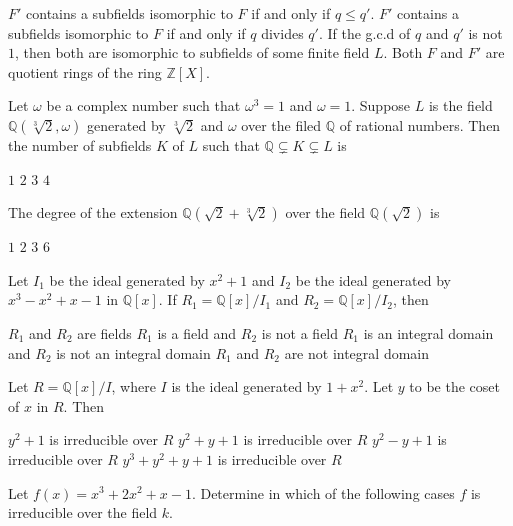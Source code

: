 \documentclass[10pt]{exam}
\begin{document}
\begin{questions}
\begin{checkboxes}
\choice $F'$ contains a subfields isomorphic to $F$ if and only if $q\leq q'$.
\choice $F'$ contains a subfields isomorphic to $F$ if and only if $q$ divides $q'$.
\choice If the g.c.d of  $q$ and $q'$ is not $1$, then both are isomorphic to subfields of some finite field $L$.
\choice Both $F$ and $F'$ are quotient rings of the ring $\mathbb{Z}[X]$.
\end{checkboxes}


\question
Let $\omega$ be a complex number such that $\omega^3=1$ and $\omega =1$. Suppose $L$ is the field $\mathbb{Q}(\sqrt[3]{2},\omega)$ generated by $\sqrt[3]{2}$ and $\omega$ over the filed $\mathbb{Q}$ of rational numbers. Then the number of subfields $K$ of $L$ such that $\mathbb{Q} \subsetneq K \subsetneq L$ is 

\begin{oneparchoices}
\choice $1$
\choice $2$
\choice $3$
\choice $4$  
\end{oneparchoices}

\question
The degree of the extension $\mathbb{Q}(\sqrt{2}+\sqrt[3]{2})$ over the field $\mathbb{Q}(\sqrt{2})$ is

\begin{oneparchoices}
\choice $1$
\choice $2$
\choice $3$
\choice $6$
\end{oneparchoices}

\question
Let $I_1$ be the ideal generated by $x^2+1$ and $I_2$ be the ideal generated by $x^3-x^2+x-1$ in $\mathbb{Q}[x]$. If $R_1=\mathbb{Q}[x]/I_1$ and $R_2=\mathbb{Q}[x]/I_2$, then

\begin{checkboxes}
\choice $R_1$ and $R_2$ are fields
\choice $R_1$ is a field and $R_2$ is not a field
\choice $R_1$ is an integral domain and $R_2$ is not an integral domain
\choice $R_1$ and $R_2$ are not integral domain
\end{checkboxes}

\question
Let $R=\mathbb{Q}[x]/I$, where $I$ is the ideal generated by $1+x^2$. Let $y$ to be the coset of $x$ in $R$. Then

\begin{checkboxes}
\choice $y^2+1$ is irreducible over $R$
\choice $y^2+y+1$ is irreducible over $R$
\choice $y^2-y+1$ is irreducible over $R$
\choice $y^3+y^2+y+1$ is irreducible over $R$
\end{checkboxes}

\question
Let $f(x)=x^3+2x^2+x-1$. Determine in which of the following cases $f$ is irreducible over the field $k$.


\end{questions}
\end{document}
